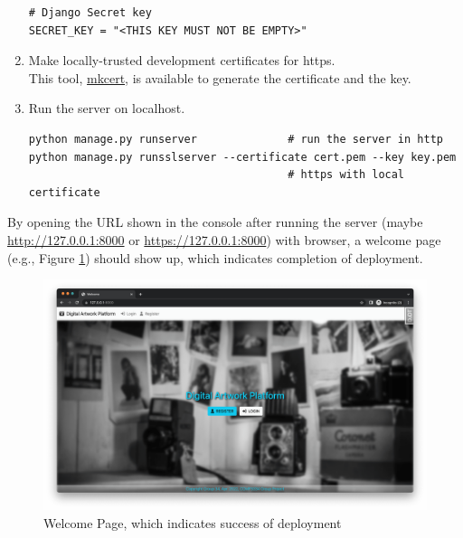 \begin{enumerate}
\begin{verbatim}
# Django Secret key
SECRET_KEY = "<THIS KEY MUST NOT BE EMPTY>"
\end{verbatim}
\item Make locally-trusted development certificates for https. \\
This tool, \href{https://github.com/FiloSottile/mkcert}{mkcert}, is available to generate the certificate and the key.
\item Run the server on localhost.
\begin{verbatim}
python manage.py runserver              # run the server in http
python manage.py runsslserver --certificate cert.pem --key key.pem
                                        # https with local certificate
\end{verbatim}
\end{enumerate}

By opening the URL shown in the console after running the server (maybe \hyperlink{http://127.0.0.1:8000}{http://127.0.0.1:8000} or \hyperlink{https://127.0.0.1:8000}{https://127.0.0.1:8000}) with browser, a welcome page (e.g., Figure \ref{fig:welcome}) should show up, which indicates completion of deployment.

\begin{figure}[h]
\centering
\includegraphics[width=\textwidth]{figures/welcome.png}
\caption{Welcome Page, which indicates success of deployment}
\label{fig:welcome}
\end{figure}
